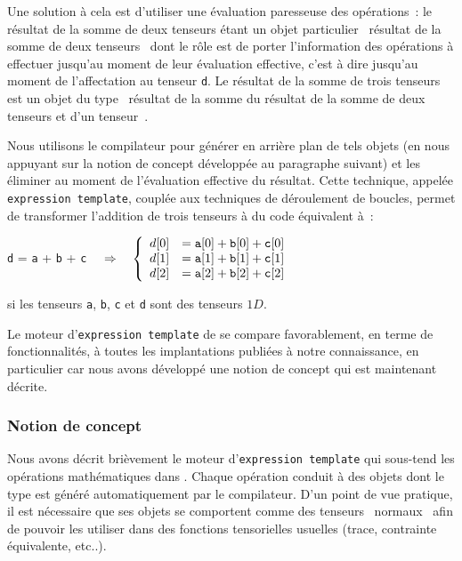 \documentclass[rectoverso,pleiades,pstricks,leqno,anti]{texmf/note_technique_2010}
\newcommand{\tfel}[1]{\index{tfel}{#1}{\texttt{#1}}}
\begin{document}
Une solution à cela est d'utiliser une évaluation paresseuse des
opérations~: le résultat de la somme de deux tenseurs étant un objet
particulier \og~résultat de la somme de deux tenseurs~\fg{} dont le
rôle est de porter l'information des opérations à effectuer jusqu'au
moment de leur évaluation effective, c'est à dire jusqu'au moment de
l'affectation au tenseur \texttt{d}. Le résultat de la somme de trois
tenseurs est un objet du type \og~résultat de la somme du résultat de
la somme de deux tenseurs et d'un tenseur~\fg{}. 

Nous utilisons le compilateur pour générer en arrière plan de tels
objets (en nous appuyant sur la notion de concept développée au
paragraphe suivant) et les éliminer au moment de l'évaluation
effective du résultat. Cette technique, appelée \texttt{expression
  template}, couplée aux techniques de déroulement de boucles, permet
de transformer l'addition de trois tenseurs à du code équivalent à~:
\begin{center}
  \texttt{d} =  \texttt{a} + \texttt{b} + \texttt{c}
  \(\quad\Rightarrow\quad
  \left\{
      \begin{array}[p]{rl}
        d[0] &= \texttt{a}[0] + \texttt{b}[0] + \texttt{c}[0] \\
        d[1] &= \texttt{a}[1] + \texttt{b}[1] + \texttt{c}[1] \\
        d[2] &= \texttt{a}[2] + \texttt{b}[2] + \texttt{c}[2] \\
      \end{array}
    \right.
    \)
\end{center}
si les tenseurs \texttt{a}, \texttt{b}, \texttt{c} et \texttt{d} sont
des tenseurs \(1D\).

Le moteur d'\texttt{expression template} de \tfel{} se compare
favorablement, en terme de fonctionnalités, à toutes les implantations
publiées à notre connaissance, en particulier car nous avons développé
une notion de concept qui est maintenant décrite.

\subsubsection{Notion de concept}

Nous avons décrit brièvement le moteur d'\texttt{expression template}
qui sous-tend les opérations mathématiques dans \tfel{}. Chaque
opération conduit à des objets dont le type est généré automatiquement
par le compilateur. D'un point de vue pratique, il est nécessaire que
ses objets se comportent comme des tenseurs \og~normaux~\fg{} afin de
pouvoir les utiliser dans des fonctions tensorielles usuelles (trace,
contrainte équivalente, etc..).
\end{document}
